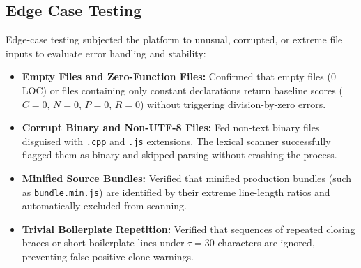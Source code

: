 \subsection{Edge Case Testing}
Edge-case testing subjected the platform to unusual, corrupted, or extreme file inputs to evaluate error handling and stability:
\begin{itemize}
    \item \textbf{Empty Files and Zero-Function Files:} Confirmed that empty files ($0$ LOC) or files containing only constant declarations return baseline scores ($C=0$, $N=0$, $P=0$, $R=0$) without triggering division-by-zero errors.
    \item \textbf{Corrupt Binary and Non-UTF-8 Files:} Fed non-text binary files disguised with \texttt{.cpp} and \texttt{.js} extensions. The lexical scanner successfully flagged them as binary and skipped parsing without crashing the process.
    \item \textbf{Minified Source Bundles:} Verified that minified production bundles (such as \texttt{bundle.min.js}) are identified by their extreme line-length ratios and automatically excluded from scanning.
    \item \textbf{Trivial Boilerplate Repetition:} Verified that sequences of repeated closing braces or short boilerplate lines under $\tau = 30$ characters are ignored, preventing false-positive clone warnings.
\end{itemize}

